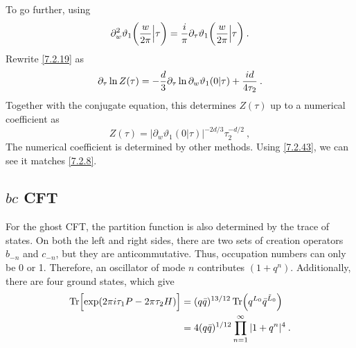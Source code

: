 To go further, using 
\begin{equation}
	\partial_{w}^{2} \vartheta_{1}\biggl(\frac{w}{2 \pi} \Big\vert \tau\biggr) = 
	\frac{i}{\pi} \partial_{\tau} \vartheta_{1}\biggl(\frac{w}{2 \pi} \Big\vert \tau \biggr) \:. \label{7.2.20} 
\end{equation}
Rewrite \eqref{7.2.19} as 
\begin{equation}
	\partial_{\tau} \ln Z(\tau)=-\frac{d}{3} \partial_{\tau} \ln \partial_{w} \vartheta_{1}(0 \vert \tau)+\frac{i d}{4 \tau_{2}} \:. \label{7.2.21} 
\end{equation}
Together with the conjugate equation, this determines $Z(\tau)$ up to a numerical coefficient as 
\begin{equation}
	Z(\tau)=|\partial_{w} \vartheta_{1}(0 \vert \tau)|^{-2 d / 3} \tau_{2}^{-d / 2} \:, \label{7.2.22} 
\end{equation}
The numerical coefficient is determined by other methods. Using \eqref{7.2.43}, we can see it matches \eqref{7.2.8}. 

\subsection*{$bc$ CFT} 

For the ghost CFT, the partition function is also determined by the trace of states. 
On both the left and right sides, there are two sets of creation operators $b_{-n}$ and $c_{-n}$, but they are anticommutative. Thus, occupation numbers can only be 0 or 1. 
Therefore, an oscillator of mode $n$ contributes $(1+q^{n})$. Additionally, there are four ground states, which give 
\begin{align}
	\operatorname{Tr}\Bigl[\exp (2 \pi i \tau_{1} P-2 \pi \tau_{2} H)\Bigr] &= 
	(q \bar{q})^{13 / 12} \operatorname{Tr}\Bigl(q^{L_{0}} \bar{q}^{\tilde{L}_{0}}\Bigr) \nonumber \\
	&=4(q \bar{q})^{1 / 12} \prod_{n=1}^{\infty}|1+q^{n}|^{4} \:. \label{7.2.23} 
\end{align}

